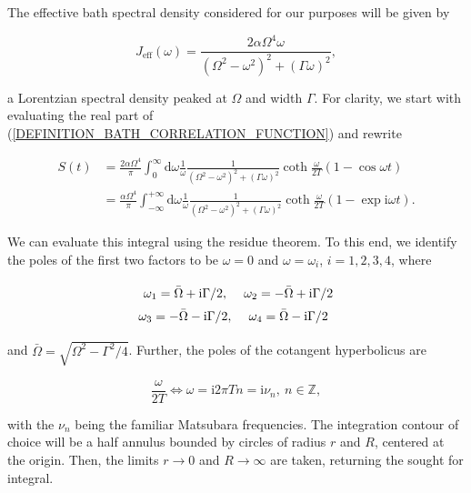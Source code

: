 \documentclass[preprint]{revtex4-2}
\begin{document}
The effective bath spectral density considered for our purposes will be given by

\begin{equation}\label{EFFECTIVE_BATH_SPECTRAL_DENSITY}
    J_{\text{eff}}(\omega)=\frac{2\alpha\Omega^4\omega}{(\Omega^2-\omega^2)^2+(\Gamma\omega)^2},
\end{equation}

a Lorentzian spectral density peaked at $\Omega$ and width $\Gamma$. For clarity, we start with
evaluating the real part of (\ref{DEFINITION_BATH_CORRELATION_FUNCTION}) and rewrite

\begin{equation}\label{EFFECTIVE_BATH_SPECTRAL_DENSITY_REAL_PART}
\begin{split}
    S(t)&=\frac{2\alpha\Omega^4}{\pi}\int_{0}^{\infty}\text{d}\omega\frac{1}{\omega}\frac{1}{(\Omega^2-\omega^2)^2+(\Gamma\omega)^2}
    \coth\frac{\omega}{2T}(1-\cos\omega t) \\
    &= \frac{\alpha\Omega^4}{\pi}\int_{-\infty}^{+\infty}\text{d}\omega\frac{1}{\omega}\frac{1}{(\Omega^2-\omega^2)^2+(\Gamma\omega)^2}\coth\frac{\omega}{2T}(1-\exp\text{i}\omega t).
\end{split}
\end{equation}

We can evaluate this integral using the residue theorem. To this end, we identify the poles of the first two
factors to be $\omega=0$ and $\omega=\omega_i$, $i=1,2,3,4$, where

\begin{equation}
    \def\arraystretch{1.5}
    \begin{array}{c c}
        \omega_1=\bar{\Omega}+\text{i}\Gamma/2,
        & \omega_2=-\bar{\Omega}+\text{i}\Gamma/2 \\
        \omega_3=-\bar{\Omega}-\text{i}\Gamma/2,
        & \omega_4=\bar{\Omega}-\text{i}\Gamma/2 \\
\end{array}
\end{equation}

and $\bar{\Omega}=\sqrt{\Omega^2-\Gamma^2/4}$. Further, the poles of the cotangent hyperbolicus are

\begin{equation}
    \frac{\omega}{2T} \Leftrightarrow \omega=\text{i}2\pi Tn=\text{i}\nu_n, \ n\in\mathbb{Z},
\end{equation}

with the $\nu_n$ being the familiar Matsubara frequencies. The integration contour of choice will be a half
annulus bounded by circles of radius $r$ and $R$, centered at the origin. Then, the limits $r\rightarrow0$
and $R\rightarrow\infty$ are taken, returning the sought for integral.
\end{document}
